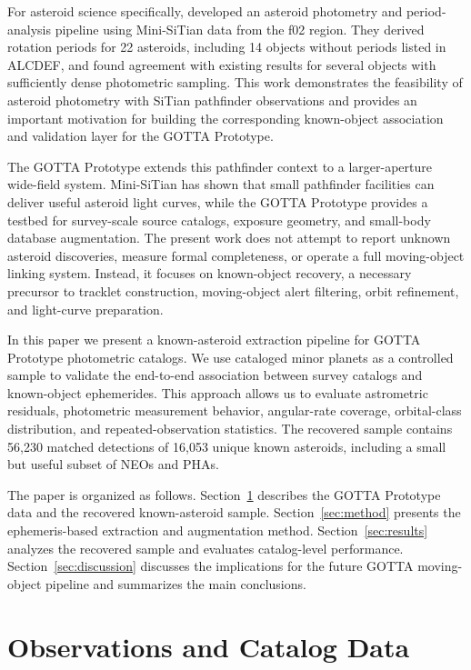 \documentclass[referee]{raa}
\begin{document}
For asteroid science specifically, \citet{LiuZhaoxing2025} developed an asteroid photometry and period-analysis pipeline using Mini-SiTian data from the f02 region. They derived rotation periods for 22 asteroids, including 14 objects without periods listed in ALCDEF, and found agreement with existing results for several objects with sufficiently dense photometric sampling. This work demonstrates the feasibility of asteroid photometry with SiTian pathfinder observations and provides an important motivation for building the corresponding known-object association and validation layer for the GOTTA Prototype.

The GOTTA Prototype extends this pathfinder context to a larger-aperture wide-field system. Mini-SiTian has shown that small pathfinder facilities can deliver useful asteroid light curves, while the GOTTA Prototype provides a testbed for survey-scale source catalogs, exposure geometry, and small-body database augmentation. The present work does not attempt to report unknown asteroid discoveries, measure formal completeness, or operate a full moving-object linking system. Instead, it focuses on known-object recovery, a necessary precursor to tracklet construction, moving-object alert filtering, orbit refinement, and light-curve preparation.

In this paper we present a known-asteroid extraction pipeline for GOTTA Prototype photometric catalogs. We use cataloged minor planets as a controlled sample to validate the end-to-end association between survey catalogs and known-object ephemerides. This approach allows us to evaluate astrometric residuals, photometric measurement behavior, angular-rate coverage, orbital-class distribution, and repeated-observation statistics. The recovered sample contains 56,230 matched detections of 16,053 unique known asteroids, including a small but useful subset of NEOs and PHAs.

The paper is organized as follows. Section~\ref{sec:data} describes the GOTTA Prototype data and the recovered known-asteroid sample. Section~\ref{sec:method} presents the ephemeris-based extraction and augmentation method. Section~\ref{sec:results} analyzes the recovered sample and evaluates catalog-level performance. Section~\ref{sec:discussion} discusses the implications for the future GOTTA moving-object pipeline and summarizes the main conclusions.

\section{Observations and Catalog Data}
\label{sec:data}
\end{document}

